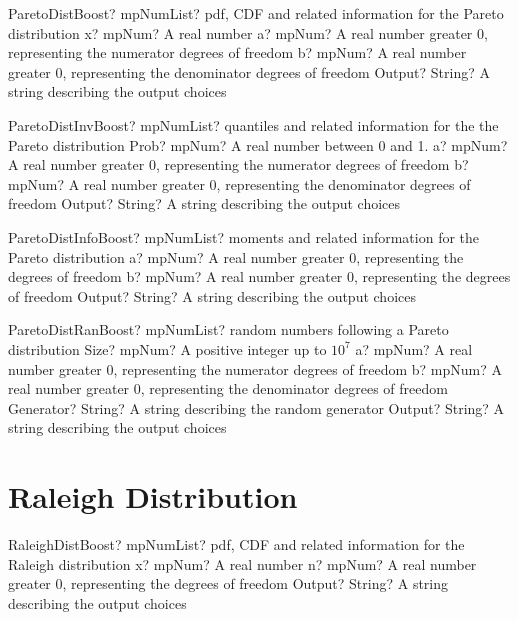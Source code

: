 \documentclass[12pt,a4paper,openany]{book}
\begin{document}
\begin{mpFunctionsExtract}
\mpFunctionFourNotImplemented
{ParetoDistBoost? mpNumList? pdf, CDF and related information for the Pareto distribution}
{x? mpNum? A real number}
{a? mpNum? A real number greater 0, representing the numerator  degrees of freedom}
{b? mpNum? A real number greater 0, representing the denominator degrees of freedom}
{Output? String? A string describing the output choices}
\end{mpFunctionsExtract}

\begin{mpFunctionsExtract}
\mpFunctionFourNotImplemented
{ParetoDistInvBoost? mpNumList? quantiles and related information for the the Pareto distribution}
{Prob? mpNum? A real number between 0 and 1.}
{a? mpNum? A real number greater 0, representing the numerator  degrees of freedom}
{b? mpNum? A real number greater 0, representing the denominator degrees of freedom}
{Output? String? A string describing the output choices}
\end{mpFunctionsExtract}

\begin{mpFunctionsExtract}
\mpFunctionThreeNotImplemented
{ParetoDistInfoBoost? mpNumList? moments and related information for the Pareto distribution}
{a? mpNum? A real number greater 0, representing the degrees of freedom}
{b? mpNum? A real number greater 0, representing the degrees of freedom}
{Output? String? A string describing the output choices}
\end{mpFunctionsExtract}

\begin{mpFunctionsExtract}
\mpFunctionFiveNotImplemented
{ParetoDistRanBoost? mpNumList? random numbers following a Pareto distribution}
{Size? mpNum? A positive integer up to $10^7$}
{a? mpNum? A real number greater 0, representing the numerator  degrees of freedom}
{b? mpNum? A real number greater 0, representing the denominator degrees of freedom}
{Generator? String? A string describing the random generator}
{Output? String? A string describing the output choices}
\end{mpFunctionsExtract}

\section{Raleigh Distribution}

\begin{mpFunctionsExtract}
\mpFunctionThreeNotImplemented
{RaleighDistBoost? mpNumList? pdf, CDF and related information for the Raleigh distribution}
{x? mpNum? A real number}
{n? mpNum? A real number greater 0, representing the degrees of freedom}
{Output? String? A string describing the output choices}
\end{mpFunctionsExtract}
\end{document}

